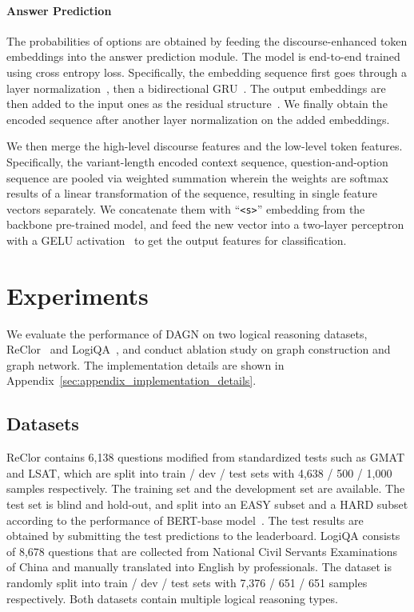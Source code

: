 \documentclass[11pt]{article}
\newcommand{\moe}[1]{{\color{black} #1}}
\begin{document}
\paragraph{Answer Prediction}
\moe{
The probabilities of options are obtained by feeding the discourse-enhanced token embeddings into the answer prediction module.
The model is end-to-end trained using cross entropy loss.}
Specifically, the embedding sequence first goes through a layer normalization~\cite{ba2016layer}, then a bidirectional GRU~\cite{cho2014properties}. The output embeddings are then added to the input ones as the residual structure~\cite{he2016deep}. 
We finally obtain the encoded sequence after another layer normalization on the added embeddings.


We then merge the high-level discourse features and the low-level token features.
Specifically, the variant-length encoded context sequence, question-and-option sequence are pooled via weighted summation wherein the weights are softmax results of a linear transformation of the sequence,
resulting in single feature vectors separately. 
We concatenate them with ``\texttt{<s>}'' embedding from the backbone pre-trained model, and feed the new vector into a two-layer perceptron with a GELU activation~\cite{hendrycks2016gaussian}
to get the output features for classification.
















\section{Experiments}
\vspace{-1mm}
We evaluate the performance of DAGN on two logical reasoning datasets, ReClor~\cite{yu2020reclor} and LogiQA~\cite{liu2020logiqa}, and conduct ablation study on graph construction and graph network. The implementation details are shown in Appendix~\ref{sec:appendix_implementation_details}.

\subsection{Datasets}
\vspace{-1mm}
ReClor contains 6,138 questions modified from standardized tests such as GMAT and LSAT, which are split into train / dev / test sets with 4,638 / 500 / 1,000 samples respectively. The training set and the development set are available.
The test set is blind and hold-out, and split into an EASY subset and a HARD subset according to the performance of BERT-base model~\cite{devlin2019bert}. 
The test results are obtained by submitting the test predictions to the leaderboard.
LogiQA consists of 8,678 questions that are collected from National Civil Servants Examinations of China and manually translated into English by professionals. 
The dataset is randomly split into train / dev / test sets with 7,376 / 651 / 651 samples respectively.
Both datasets contain multiple logical reasoning types. 
\end{document}
